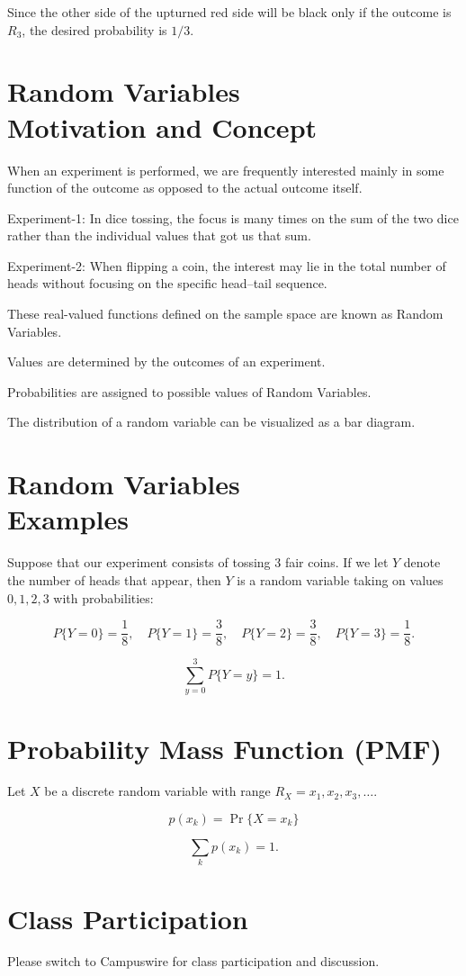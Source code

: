 \documentclass[12pt]{article}
\begin{document}
Since the other side of the upturned red side will be black only if the outcome is $R_3$, the desired probability is $1/3$.

\section*{Random Variables\\Motivation and Concept}

When an experiment is performed, we are frequently interested mainly in some function of the outcome as opposed to the actual outcome itself.

Experiment-1: In dice tossing, the focus is many times on the sum of the two dice rather than the individual values that got us that sum.

Experiment-2: When flipping a coin, the interest may lie in the total number of heads without focusing on the specific head--tail sequence.

These real-valued functions defined on the sample space are known as Random Variables.

Values are determined by the outcomes of an experiment.

Probabilities are assigned to possible values of Random Variables.

The distribution of a random variable can be visualized as a bar diagram.

\section*{Random Variables\\Examples}

Suppose that our experiment consists of tossing 3 fair coins. If we let $Y$ denote the number of heads that appear, then $Y$ is a random variable taking on values $0,1,2,3$ with probabilities:

\[
P\{Y=0\} = \frac{1}{8}, \quad
P\{Y=1\} = \frac{3}{8}, \quad
P\{Y=2\} = \frac{3}{8}, \quad
P\{Y=3\} = \frac{1}{8}.
\]

\[
\sum_{y=0}^{3} P\{Y=y\} = 1.
\]

\section*{Probability Mass Function (PMF)}

Let $X$ be a discrete random variable with range $R_X = x_1, x_2, x_3, \dots$.

\[
p(x_k) = \Pr\{X = x_k\}
\]

\[
\sum_k p(x_k) = 1.
\]

\section*{Class Participation}

Please switch to Campuswire for class participation and discussion.
\end{document}
